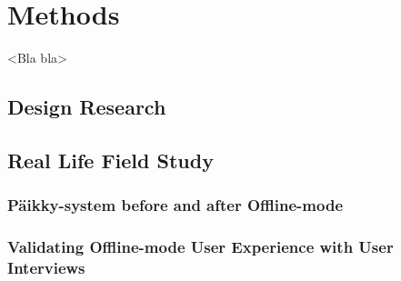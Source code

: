 
\chapter{Methods}
<Bla bla>

\section{Design Research}


\section{Real Life Field Study}
\subsection{Päikky-system before and after Offline-mode}

\subsection{Validating Offline-mode User Experience with User Interviews}

  


